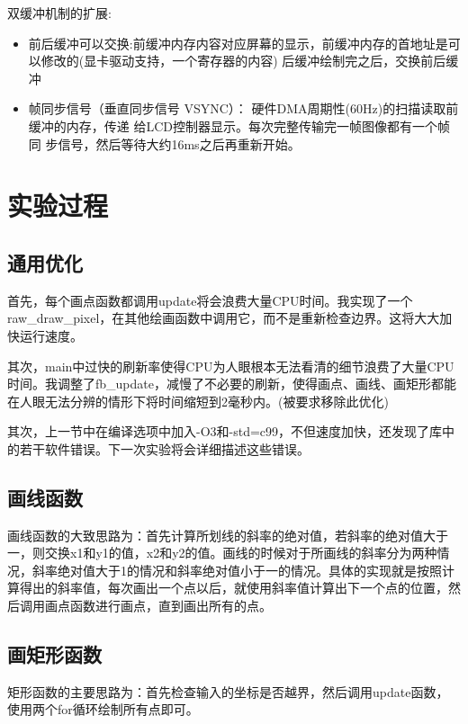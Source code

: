 \documentclass{report}
\begin{document}
\par 双缓冲机制的扩展:
\begin{itemize}
    \item 前后缓冲可以交换:前缓冲内存内容对应屏幕的显示，前缓冲内存的首地址是可以修改的(显卡驱动支持，一个寄存器的内容) 后缓冲绘制完之后，交换前后缓冲
    \item 帧同步信号（垂直同步信号 VSYNC）： 硬件DMA周期性(60Hz)的扫描读取前缓冲的内存，传递 给LCD控制器显示。每次完整传输完一帧图像都有一个帧同 步信号，然后等待大约16ms之后再重新开始。
\end{itemize}

\section{实验过程}
\subsection{通用优化}
\par 首先，每个画点函数都调用update将会浪费大量CPU时间。我实现了一个raw\_draw\_pixel，在其他绘画函数中调用它，而不是重新检查边界。这将大大加快运行速度。
\par 其次，main中过快的刷新率使得CPU为人眼根本无法看清的细节浪费了大量CPU时间。我调整了fb\_update，减慢了不必要的刷新，使得画点、画线、画矩形都能在人眼无法分辨的情形下将时间缩短到2毫秒内。(被要求移除此优化)
\par 其次，上一节中在编译选项中加入-O3和-std=c99，不但速度加快，还发现了库中的若干软件错误。下一次实验将会详细描述这些错误。

\subsection{画线函数}
\par 画线函数的大致思路为：首先计算所划线的斜率的绝对值，若斜率的绝对值大于一，则交换x1和y1的值，x2和y2的值。画线的时候对于所画线的斜率分为两种情况，斜率绝对值大于1的情况和斜率绝对值小于一的情况。具体的实现就是按照计算得出的斜率值，每次画出一个点以后，就使用斜率值计算出下一个点的位置，然后调用画点函数进行画点，直到画出所有的点。

\subsection{画矩形函数}
\par 矩形函数的主要思路为：首先检查输入的坐标是否越界，然后调用update函数，使用两个for循环绘制所有点即可。
\end{document}
